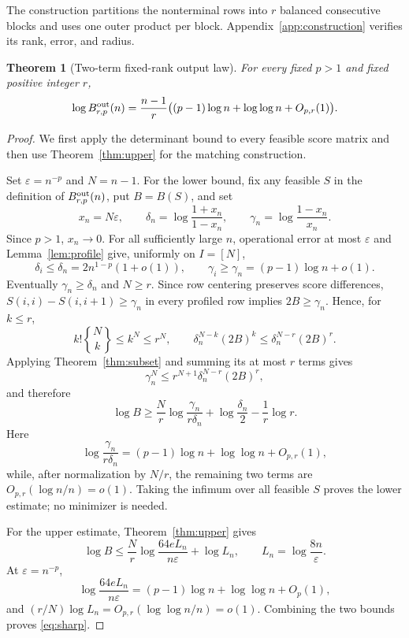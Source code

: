 \documentclass[10pt]{article} %
\newtheorem{theorem}{Theorem}
\theoremstyle{definition}
\newcommand{\Stirling}[2]{\genfrac{\{}{\}}{0pt}{}{#1}{#2}}
\begin{document}
The construction partitions the nonterminal rows into \(r\) balanced
consecutive blocks and uses one outer product per block.
Appendix~\ref{app:construction} verifies its rank, error, and radius.

\begin{theorem}[Two-term fixed-rank output law]\label{thm:sharp}
For every fixed \(p>1\) and fixed positive integer \(r\),
\begin{equation}\label{eq:sharp}
 \log B^{\rm out}_{r,p}(n)
 =\frac{n-1}{r}
 \bigl((p-1)\log n+\log\log n+O_{p,r}(1)\bigr).
\end{equation}
\end{theorem}

\begin{proof}
We first apply the determinant bound to every feasible score matrix and then
use Theorem~\ref{thm:upper} for the matching construction.

Set \(\varepsilon=n^{-p}\) and \(N=n-1\).  For the lower bound, fix any
feasible \(S\) in the definition of \(B^{\rm out}_{r,p}(n)\), put
\(B=B(S)\), and set
\[
 x_n=N\varepsilon,\qquad
 \delta_n=\log\frac{1+x_n}{1-x_n},\qquad
 \gamma_n=\log\frac{1-x_n}{x_n}.
\]
Since \(p>1\), \(x_n\to0\).  For all sufficiently large \(n\), operational
error at most \(\varepsilon\) and Lemma~\ref{lem:profile} give, uniformly on
\(I=[N]\),
\[
 \delta_i\le\delta_n=2n^{1-p}(1+o(1)),\qquad
 \gamma_i\ge\gamma_n=(p-1)\log n+o(1).
\]
Eventually \(\gamma_n\ge\delta_n\) and \(N\ge r\).  Since row centering
preserves score differences, \(S(i,i)-S(i,i+1)\ge\gamma_n\) in every
profiled row implies \(2B\ge\gamma_n\).  Hence, for \(k\le r\),
\[
 k!\Stirling{N}{k}\le k^N\le r^N,\qquad
 \delta_n^{N-k}(2B)^k
 \le\delta_n^{N-r}(2B)^r.
\]
Applying Theorem~\ref{thm:subset} and summing its at most \(r\) terms gives
\[
 \gamma_n^N\le r^{N+1}\delta_n^{N-r}(2B)^r,
\]
and therefore
\[
 \log B\ge\frac Nr\log\frac{\gamma_n}{r\delta_n}
 +\log\frac{\delta_n}{2}-\frac1r\log r.
\]
Here
\[
 \log\frac{\gamma_n}{r\delta_n}
 =(p-1)\log n+\log\log n+O_{p,r}(1),
\]
while, after normalization by \(N/r\), the remaining two terms are
\(O_{p,r}(\log n/n)=o(1)\).  Taking the infimum over all feasible \(S\)
proves the lower estimate; no minimizer is needed.

For the upper estimate, Theorem~\ref{thm:upper} gives
\[
 \log B\le\frac Nr
 \log\frac{64eL_n}{n\varepsilon}+\log L_n,
 \qquad L_n=\log\frac{8n}{\varepsilon}.
\]
At \(\varepsilon=n^{-p}\),
\[
 \log\frac{64eL_n}{n\varepsilon}
 =(p-1)\log n+\log\log n+O_p(1),
\]
and \((r/N)\log L_n=O_{p,r}(\log\log n/n)=o(1)\).  Combining the two
bounds proves \eqref{eq:sharp}.
\end{proof}
\end{document}
